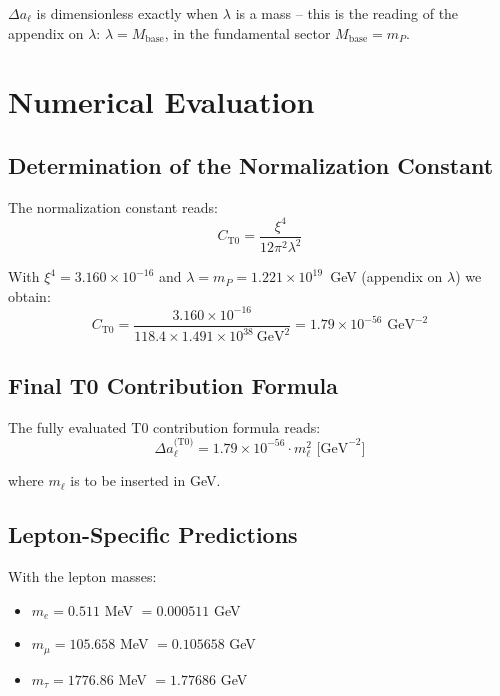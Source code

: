 	$\Delta a_\ell$ is dimensionless exactly when $\lambda$ is a mass -- this is the reading of the appendix on $\lambda$: $\lambda = M_\text{base}$, in the fundamental sector $M_\text{base} = m_P$.

	\section{Numerical Evaluation}

	\subsection{Determination of the Normalization Constant}

	The normalization constant reads:
	\begin{equation}
		C_{\text{T0}} = \frac{\xi^4}{12\pi^2\lambda^2}
		\label{eq:normalization_constant}
	\end{equation}

	With $\xi^4 = 3.160 \times 10^{-16}$ and $\lambda = m_P = 1.221 \times 10^{19}$~GeV (appendix on $\lambda$) we obtain:
	\begin{equation}
		C_{\text{T0}} = \frac{3.160 \times 10^{-16}}{118.4 \times 1.491 \times 10^{38}\ \text{GeV}^2} = 1.79 \times 10^{-56} \text{ GeV}^{-2}
		\label{eq:numerical_constant}
	\end{equation}

	\subsection{Final T0 Contribution Formula}

	The fully evaluated T0 contribution formula reads:
	\begin{equation}
		\boxed{\Delta a_\ell^{\text{(T0)}} = 1.79 \times 10^{-56} \cdot m_\ell^2 \text{ [GeV}^{-2}\text{]}}
		\label{eq:final_t0_formula}
	\end{equation}

	where $m_\ell$ is to be inserted in GeV.

	\subsection{Lepton-Specific Predictions}

	With the lepton masses:
	\begin{itemize}
		\item $m_e = 0.511$ MeV $= 0.000511$ GeV
		\item $m_\mu = 105.658$ MeV $= 0.105658$ GeV
		\item $m_\tau = 1776.86$ MeV $= 1.77686$ GeV
	\end{itemize}

